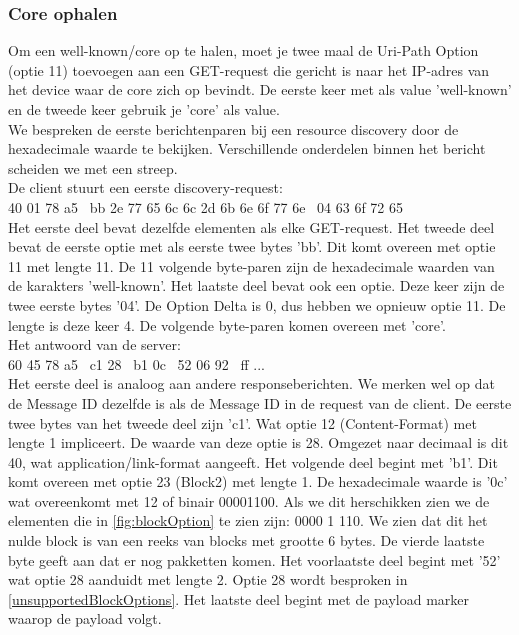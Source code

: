 \subsubsection{Core ophalen}
Om een well-known/core op te halen, moet je twee maal de Uri-Path Option (optie 11) toevoegen aan een GET-request die gericht is naar het IP-adres van het device waar de core zich op bevindt. De eerste keer met als value 'well-known' en de tweede keer gebruik je 'core' als value.\\

\noindent
We bespreken de eerste berichtenparen bij een resource discovery door de hexadecimale waarde te bekijken. Verschillende onderdelen binnen het bericht scheiden we met een streep.\\

\noindent
De client stuurt een eerste discovery-request:\\
40 01 78 a5 \textbar~bb 2e 77 65 6c 6c 2d 6b 6e 6f 77 6e \textbar~04 63 6f 72 65\\
Het eerste deel bevat dezelfde elementen als elke GET-request. Het tweede deel bevat de eerste optie met als eerste twee bytes 'bb'. Dit komt overeen met optie 11 met lengte 11. De 11 volgende byte-paren zijn de hexadecimale waarden van de karakters 'well-known'. Het laatste deel bevat ook een optie. Deze keer zijn de twee eerste bytes '04'. De Option Delta is 0, dus hebben we opnieuw optie 11. De lengte is deze keer 4. De volgende byte-paren komen overeen met 'core'.\\

\noindent
Het antwoord van de server:\\
60 45 78 a5 \textbar~c1 28 \textbar~b1 0c \textbar~52 06 92 \textbar~ff ...\\
Het eerste deel is analoog aan andere responseberichten. We merken wel op dat de Message ID dezelfde is als de Message ID in de request van de client. De eerste twee bytes van het tweede deel zijn 'c1'. Wat optie 12 (Content-Format) met lengte 1 impliceert. De waarde van deze optie is 28. Omgezet naar decimaal is dit 40, wat application/link-format aangeeft. Het volgende deel begint met 'b1'. Dit komt overeen met optie 23 (Block2) met lengte 1. De hexadecimale waarde is '0c' wat overeenkomt met 12 of binair 00001100. Als we dit herschikken zien we de elementen die in \ref{fig:blockOption} te zien zijn: 0000 1 110. We zien dat dit het nulde block is van een reeks van blocks met grootte 6 bytes. De vierde laatste byte geeft aan dat er nog pakketten komen. Het voorlaatste deel begint met '52' wat optie 28 aanduidt met lengte 2. Optie 28 wordt besproken in \ref{unsupportedBlockOptions}. Het laatste deel begint met de payload marker waarop de payload volgt.\\

